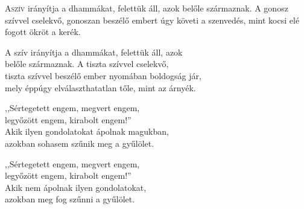 
\vspace*{-\baselineskip}

\begin{firstdhpverse}[-0.5\baselineskip]{1}
\lettrine[slope=0.5em]{A}{szív} {\LettrineTextFont irányítja a dhammákat, felettük áll,}\newline
azok belőle származnak. A gonosz szívvel\newline
cselekvő, gonoszan beszélő embert\newline
úgy követi a szenvedés,\newline
mint kocsi elé fogott ökröt a kerék.
\end{firstdhpverse}

\begin{dhpverse}

 A szív irányítja a dhammákat, felettük áll, azok\\
belőle származnak. A tiszta szívvel cselekvő,\\
tiszta szívvel beszélő ember nyomában boldogság jár,\\
mely éppúgy elválaszthatatlan tőle, mint az árnyék.

 ,,Sértegetett engem, megvert engem,\\
legyőzött engem, kirabolt engem!''\\
Akik ilyen gondolatokat ápolnak magukban,\\
azokban sohasem szűnik meg a gyűlölet.

 ,,Sértegetett engem, megvert engem,\\
legyőzött engem, kirabolt engem!''\\
Akik nem ápolnak ilyen gondolatokat,\\
azokban meg fog szűnni a gyűlölet.

\end{dhpverse}
\newpage
